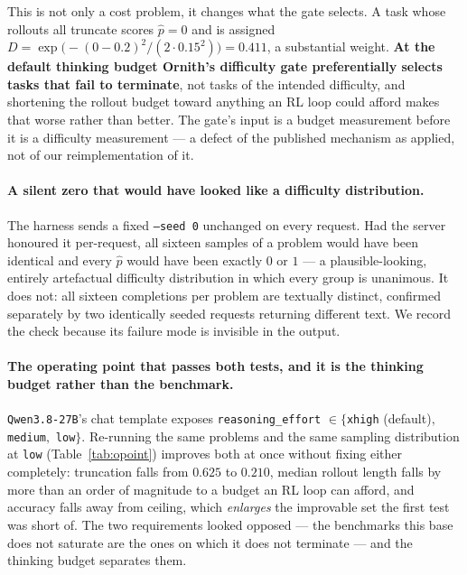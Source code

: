 This is not only a cost problem, it changes what the gate selects. A task whose rollouts all
truncate scores $\hat p=0$ and is assigned
$D=\exp\!\big(-(0-0.2)^2/(2\cdot 0.15^2)\big)=0.411$, a substantial weight. \textbf{At the
default thinking budget Ornith's difficulty gate preferentially selects tasks that fail to
terminate}, not tasks of the intended difficulty, and shortening the rollout budget toward
anything an RL loop could afford makes that worse rather than better. The gate's input is a
budget measurement before it is a difficulty measurement --- a defect of the published
mechanism as applied, not of our reimplementation of it.

\paragraph{A silent zero that would have looked like a difficulty distribution.} The harness
sends a fixed \texttt{--seed 0} unchanged on every request. Had the server honoured it
per-request, all sixteen samples of a problem would have been identical and every $\hat p$
would have been exactly $0$ or $1$ --- a plausible-looking, entirely artefactual difficulty
distribution in which every group is unanimous. It does not: all sixteen completions per
problem are textually distinct, confirmed separately by two identically seeded requests
returning different text. We record the check because its failure mode is invisible in the
output.

\paragraph{The operating point that passes both tests, and it is the thinking budget rather
than the benchmark.} \texttt{Qwen3.8-27B}'s chat template exposes
\texttt{reasoning\_effort} $\in\{$\texttt{xhigh} (default)$,$ \texttt{medium}$,$
\texttt{low}$\}$. Re-running the same problems and the same sampling distribution at
\texttt{low} (Table~\ref{tab:opoint}) improves both at once without fixing either
completely: truncation falls from $0.625$ to $0.210$, median rollout length falls by more
than an order of magnitude to a budget an RL loop can afford, and accuracy falls away from
ceiling, which \emph{enlarges} the improvable set the first test was short of. The two requirements looked opposed --- the benchmarks this base does
not saturate are the ones on which it does not terminate --- and the thinking budget separates
them.

